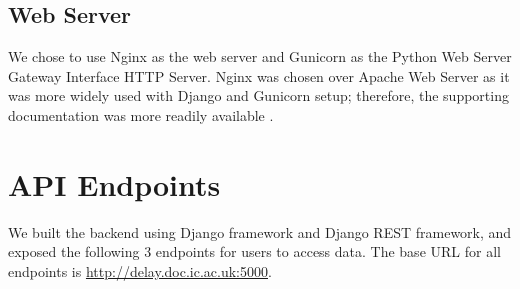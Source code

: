 \subsection{Web Server}
\label{sec:gunicorn}
We chose to use Nginx\cite{nginx} as the web server and Gunicorn\cite{gunicorn} as the Python Web Server Gateway Interface HTTP Server. Nginx was chosen over Apache Web Server as it was more widely used with Django and Gunicorn setup; therefore, the supporting documentation was more readily available \cite{nginx_gunicorn_django}.

\section{API Endpoints}
\par We built the backend using Django framework and Django REST framework, and exposed the following 3 endpoints for users to access data. The base URL for all endpoints is \url{http://delay.doc.ic.ac.uk:5000}.
